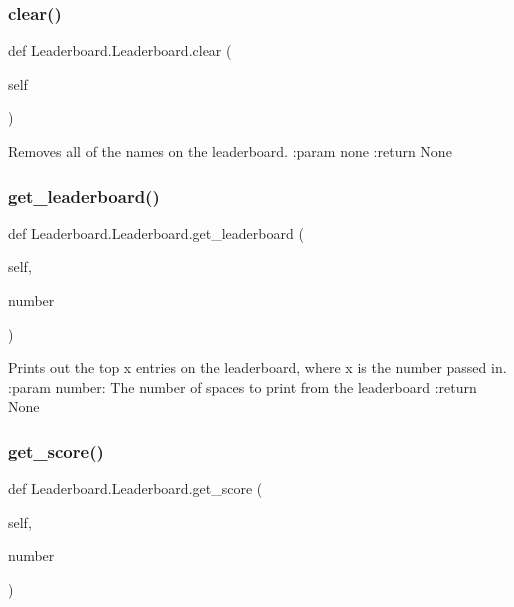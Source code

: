 \subsubsection{\texorpdfstring{clear()}{clear()}}
{\footnotesize\ttfamily def Leaderboard.\+Leaderboard.\+clear (\begin{DoxyParamCaption}\item[{}]{self }\end{DoxyParamCaption})}

\begin{DoxyVerb}Removes all of the names on the leaderboard.
:param none
:return None
\end{DoxyVerb}
 \mbox{\label{class_leaderboard_1_1_leaderboard_a3e17718a0ee4803bce571e3577fa75de}} 
\subsubsection{\texorpdfstring{get\+\_\+leaderboard()}{get\_leaderboard()}}
{\footnotesize\ttfamily def Leaderboard.\+Leaderboard.\+get\+\_\+leaderboard (\begin{DoxyParamCaption}\item[{}]{self,  }\item[{}]{number }\end{DoxyParamCaption})}

\begin{DoxyVerb}Prints out the top x entries on the leaderboard, where x is the number passed in.
:param number: The number of spaces to print from the leaderboard
:return None
\end{DoxyVerb}
 \mbox{\label{class_leaderboard_1_1_leaderboard_aa1a10cb11235dc6ba207e0cff6586906}} 
\subsubsection{\texorpdfstring{get\+\_\+score()}{get\_score()}}
{\footnotesize\ttfamily def Leaderboard.\+Leaderboard.\+get\+\_\+score (\begin{DoxyParamCaption}\item[{}]{self,  }\item[{}]{number }\end{DoxyParamCaption})}

